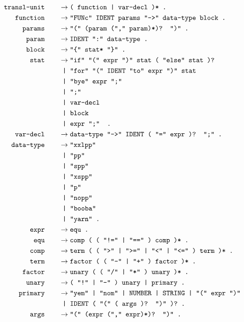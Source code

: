 \documentclass[12pt, a4paper]{article}
\newcommand{\ttt}[1]{
    \text{\texttt{#1}}
}
\newcommand{\ebnfnode}[2]{%
    #1\hspace{20px} &\to #2\ttt{ .}\\
}
\newcommand{\ebnfnodett}[2]{%
    \ebnfnode{\ttt{#1}}{\ttt{#2}}
}
\begin{document}
    \begin{align*}
        \ebnfnodett{transl-unit}{( function | var-decl )*}
        \ebnfnodett{function}{"FUNc" IDENT params "->" data-type block}
        \ebnfnodett{params}{"(" (param ("," param)*)? ")"}
        \ebnfnodett{param}{IDENT ":" data-type}
        \ebnfnodett{block}{"\{" stat* "\}"}
        \ebnfnode{\ttt{stat}}
        {%
            \ttt{"if" "(" expr ")" stat ( "else" stat )?}\\
            &\ttt{ | "for" "(" IDENT "to" expr ")" stat }\\
            &\ttt{ | "bye" expr ";" }\\
            &\ttt{ | ";" }\\
            &\ttt{ | var-decl }\\
            &\ttt{ | block }\\
            &\ttt{ | expr ";" }
        }
        \ebnfnodett{var-decl}{data-type "->" IDENT ( "=" expr )? ";"}
        \ebnfnode{\ttt{data-type}}
        {%
            \ttt{"xxlpp"}\\
            &\ttt{ | "pp"}\\
            &\ttt{ | "spp"}\\
            &\ttt{ | "xspp"}\\
            &\ttt{ | "p"}\\
            &\ttt{ | "nopp"}\\
            &\ttt{ | "booba"}\\
            &\ttt{ | "yarn"}
        }
        \ebnfnodett{expr}{equ}
        \ebnfnodett{equ}{comp ( ( "!=" | "==" ) comp )*}
        \ebnfnodett{comp}{term ( ( ">" | ">=" | "<" | "<=" ) term )*}
        \ebnfnodett{term}{factor ( ( "-" | "+" ) factor )*}
        \ebnfnodett{factor}{unary ( ( "/" | "*" ) unary )*}
        \ebnfnodett{unary}{( "!" | "-" ) unary | primary}
        \ebnfnode{\ttt{primary}}
        {%
            \ttt{"yem" | "nom" | NUMBER | STRING | "(" expr ")"}\\
            &\ttt{ | IDENT ( "(" ( args )? ")" )?}
        }
        \ebnfnodett{args}{"(" (expr ("," expr)*)? ")"}
    \end{align*}
\end{document}
